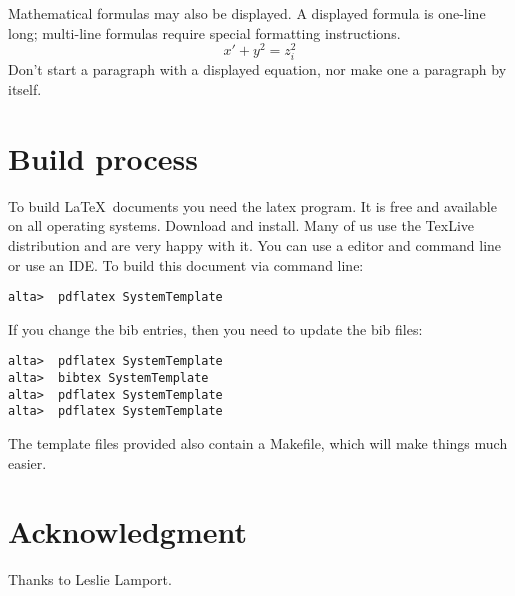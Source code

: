 Mathematical formulas may also be displayed.  A displayed formula is
one-line long; multi-line formulas require special formatting
instructions.
   \[  x' + y^{2} = z_{i}^{2}\]
Don't start a paragraph with a displayed equation, nor make
one a paragraph by itself.

\section{Build process}

To build \LaTeX\ documents you need the latex program.  It is free and available on all operating systems.   Download and install.  Many of us use the TexLive distribution and are very happy with it.    You can use a editor and command line or use an IDE.  To build this document via command line:

\begin{verbatim}
alta>  pdflatex SystemTemplate
\end{verbatim}
If you change the bib entries, then you need to update the bib files:
\begin{verbatim}
alta>  pdflatex SystemTemplate
alta>  bibtex SystemTemplate
alta>  pdflatex SystemTemplate
alta>  pdflatex SystemTemplate
\end{verbatim}

The template files provided also contain a Makefile, which will
make things much easier.  

\section*{Acknowledgment}
Thanks to Leslie Lamport.  


